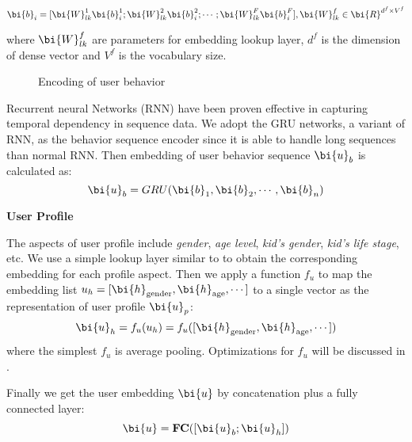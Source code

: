 \begin{equation}
\label{eqn:lookup}
\bi{b}_i = [\bi{W}_{lk}^{1}\bi{b}_{i}^{1}; \bi{W}_{lk}^{2}\bi{b}_{i}^{2}; \cdots; \bi{W}_{lk}^{F}\bi{b}_{i}^{F}],
\bi{W}_{lk}^{f} \in \bi{R}^{d^{f} \times V^{f}} 
\end{equation}

\noindent
where $\bi{W}_{lk}^{f}$ are parameters for embedding lookup layer,
$d^{f}$ is the dimension of dense vector and $V^{f}$ is the vocabulary size.


\begin{figure}[th]
	\centering
	\caption{Encoding of user behavior}
	\label{fig:detail_2}
\end{figure}

Recurrent neural Networks (RNN) have been proven effective in capturing temporal dependency in sequence data.
We adopt the GRU \cite{cho2014properties} networks, a variant of RNN, as the behavior sequence encoder
since it is able to handle long sequences than normal RNN.
Then embedding of user behavior sequence $\bi{u}_b$ is calculated as:
\begin{equation}
\bi{u}_b = GRU(\bi{b}_1, \bi{b}_2, \cdots, \bi{b}_n)
\end{equation}

\noindent
\textbf{User Profile}

\noindent
The aspects of user profile include \textit{gender}, \textit{age level}, \textit{kid's gender}, \textit{kid's life stage}, etc.
We use a simple lookup layer similar to  to obtain the corresponding embedding for each profile aspect.
Then we apply a function $f_{u}$ to map the embedding list 
$u_h = [\bi{h}_{\text{gender}}, \bi{h}_{\text{age}}, \cdots]$ to a single vector as the representation of user profile $\bi{u}_p$:
\begin{equation}
\label{eqn:fu}
\bi{u}_h = f_u(u_h) = f_u([\bi{h}_{\text{gender}}, \bi{h}_{\text{age}}, \cdots])
\end{equation}
where the simplest $f_u$ is average pooling. Optimizations for $f_u$ will be discussed in .

Finally we get the user embedding $\bi{u}$ by concatenation plus a fully connected layer:
\begin{equation}
\bi{u} = \textbf{FC}([\bi{u}_{b};\bi{u}_{h}])
\end{equation}

